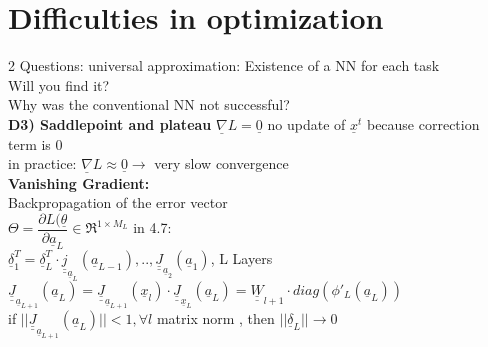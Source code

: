 
\section{Difficulties in optimization }
2 Questions:
\textbullet universal approximation: Existence of a NN for each task\\
Will you find it?\\
\textbullet Why was the conventional NN not successful? \\
\textbf{D3) Saddlepoint and plateau}
$  \underline{\nabla} L = \underline{0}  $ no update of $  \underline{x}^t $ because correction term is 0\\
in practice: $  \underline{\nabla} L \approx \underline{0} \rightarrow  $ very slow convergence\\
 \textbf{Vanishing Gradient:}\\
 Backpropagation of the error vector \\
 $  \Theta = \dfrac{\partial L (\underline{\theta}}{\partial \underline{a}_L} \in \Re^{1 \times M_L} $ in 4.7:\\
 $  \underline{\delta}_1^T = \underline{ \delta}_L ^T \cdot \underline{\underline{j}}_{\underline{a}_L} (\underline{a}_{L-1}),.., \underline{\underline{J}}_{\underline{a}_2} (\underline{a}_1) $, L Layers\\
 $ \underline{\underline{J}}_{\underline{a}_{L+1}} (\underline{a}_L) = \underline{\underline{J}}_{\underline{a}_{L+1}} (\underline{x}_l) \cdot \underline{\underline{J}}_{\underline{x}_L} (\underline{a}_L) = \underline{\underline{W}}_{l+1} \cdot diag( \phi'_{L} (\underline{a}_L))   $\\
 if $  || \underline{\underline{J}}_{\underline{a}_{L+1}} (\underline{a}_L) || < 1, \forall l $ matrix norm , then $  || \underline{\delta}_L || \rightarrow 0  $ \\
